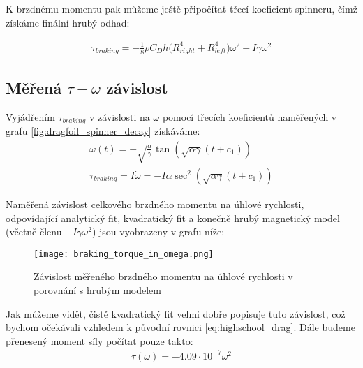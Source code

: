 K brzdnému momentu pak můžeme ještě připočítat třecí koeficient spinneru, čímž získáme finální hrubý odhad:

\begin{equation}
    \label{eq:braking_torque_w_spinner_drag}
    \begin{gathered}
        \tau_{braking} = -\frac{1}{8} \rho C_D h \big( R_{right}^4 + R_{left}^4 \big) \omega^2 -I\gamma\omega^2
    \end{gathered}
\end{equation}

\clearpage

\subsection{Měřená $\tau-\omega$ závislost}

Vyjádřením $\tau_{braking}$ v závislosti na $\omega$ pomocí třecích koeficientů naměřených v grafu \ref{fig:dragfoil_spinner_decay} získáváme:
\begin{equation}
    \label{eq:braking_torque_from_coefs}
    \begin{gathered}
        \omega(t) = - \sqrt{\frac{\alpha}{\gamma}} \tan{(\sqrt{\alpha\gamma}(t+c_1))} \\
        \tau_{braking} = I\dot{\omega} = -I\alpha \sec^2(\sqrt{\alpha \gamma} (t + c_1))
    \end{gathered}
\end{equation}

Naměřená závislost celkového brzdného momentu na úhlové rychlosti, odpovídající analytický fit, kvadratický fit a konečně hrubý magnetický model (včetně členu $-I\gamma\omega^2$) jsou vyobrazeny v grafu níže:

\begin{figure}[H]
    \texttt{[image: braking\_torque\_in\_omega.png]}
    \centering
    \caption[Závislost brzdného momentu na úhlové rychlosti]{Závislost měřeného brzdného momentu na úhlové rychlosti v porovnání s hrubým modelem}
    \label{fig:braking_torque_in_omega}
\end{figure}

Jak můžeme vidět, čistě kvadratický fit velmi dobře popisuje tuto závislost, což bychom očekávali vzhledem k původní rovnici \ref{eq:highschool_drag}. Dále budeme přenesený moment síly počítat pouze takto: 
\begin{equation}
    \label{eq:torque_transf_final}
    \begin{gathered}
        \tau(\omega) = -4.09\cdot10^{-7}\omega^2
    \end{gathered}
\end{equation}

